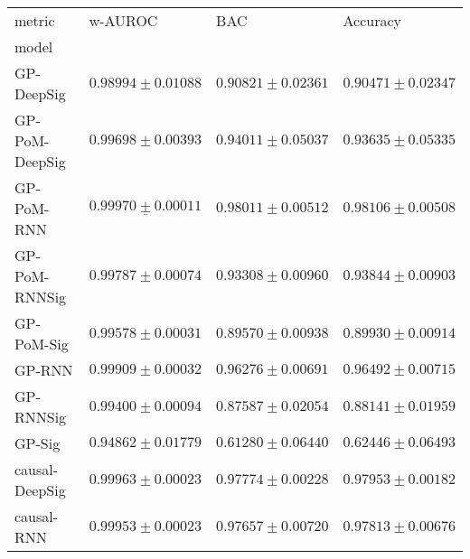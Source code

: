 \begin{tabular}{llll}
\toprule
metric &                                           w-AUROC &                                               BAC &                                          Accuracy \\
model          &                                                   &                                                   &                                                   \\
\midrule
GP-DeepSig     &                           $ 0.98994 \pm 0.01088 $ &                           $ 0.90821 \pm 0.02361 $ &                           $ 0.90471 \pm 0.02347 $ \\
GP-PoM-DeepSig &                           $ 0.99698 \pm 0.00393 $ &                           $ 0.94011 \pm 0.05037 $ &                           $ 0.93635 \pm 0.05335 $ \\
GP-PoM-RNN     &            $  \underline{ 0.99970 \pm 0.00011 } $ &                           $ 0.98011 \pm 0.00512 $ &                           $ 0.98106 \pm 0.00508 $ \\
GP-PoM-RNNSig  &                           $ 0.99787 \pm 0.00074 $ &                           $ 0.93308 \pm 0.00960 $ &                           $ 0.93844 \pm 0.00903 $ \\
GP-PoM-Sig     &                           $ 0.99578 \pm 0.00031 $ &                           $ 0.89570 \pm 0.00938 $ &                           $ 0.89930 \pm 0.00914 $ \\
GP-RNN         &                           $ 0.99909 \pm 0.00032 $ &                           $ 0.96276 \pm 0.00691 $ &                           $ 0.96492 \pm 0.00715 $ \\
GP-RNNSig      &                           $ 0.99400 \pm 0.00094 $ &                           $ 0.87587 \pm 0.02054 $ &                           $ 0.88141 \pm 0.01959 $ \\
GP-Sig         &                           $ 0.94862 \pm 0.01779 $ &                           $ 0.61280 \pm 0.06440 $ &                           $ 0.62446 \pm 0.06493 $ \\
causal-DeepSig &                           $ 0.99963 \pm 0.00023 $ &                           $ 0.97774 \pm 0.00228 $ &                           $ 0.97953 \pm 0.00182 $ \\
causal-RNN     &                           $ 0.99953 \pm 0.00023 $ &                           $ 0.97657 \pm 0.00720 $ &                           $ 0.97813 \pm 0.00676 $ \\

\end{tabular}

